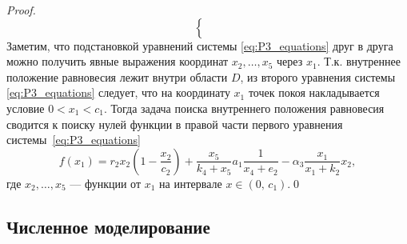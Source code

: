 \documentclass[14pt,a4paper]{extarticle}
\begin{document}
\begin{proof}
\begin{equation}
\begin{cases}
\begin{aligned}
				\end{aligned}
			\end{cases}
		\end{equation}
		Заметим, что подстановкой уравнений системы \ref{eq:P3_equations} друг в друга можно получить явные выражения координат $x_2,\ldots,x_5$ через $x_1$. Т.к. внутреннее положение равновесия лежит внутри области $D$, из второго уравнения системы \ref{eq:P3_equations} следует, что на координату $x_1$ точек покоя накладывается условие $0 < x_1 < c_1$. Тогда задача поиска внутреннего положения равновесия сводится к поиску нулей функции в правой части первого уравнения системы~\ref{eq:P3_equations}
		\[f(x_1)=r_2x_2\left(1-\dfrac{x_2}{c_2}\right)+\dfrac{x_5}{k_4+x_5}a_1\dfrac{1}{x_4+e_2}-\alpha_3\dfrac{x_1}{x_1+k_2}x_2,\]
		где $x_2,\ldots,x_5$ --- функции от $x_1$ на интервале $x\in\left(0,\, c_1\right)$.\qed
	\end{proof}
	
	\subsection{Численное моделирование}
	
\end{document}
